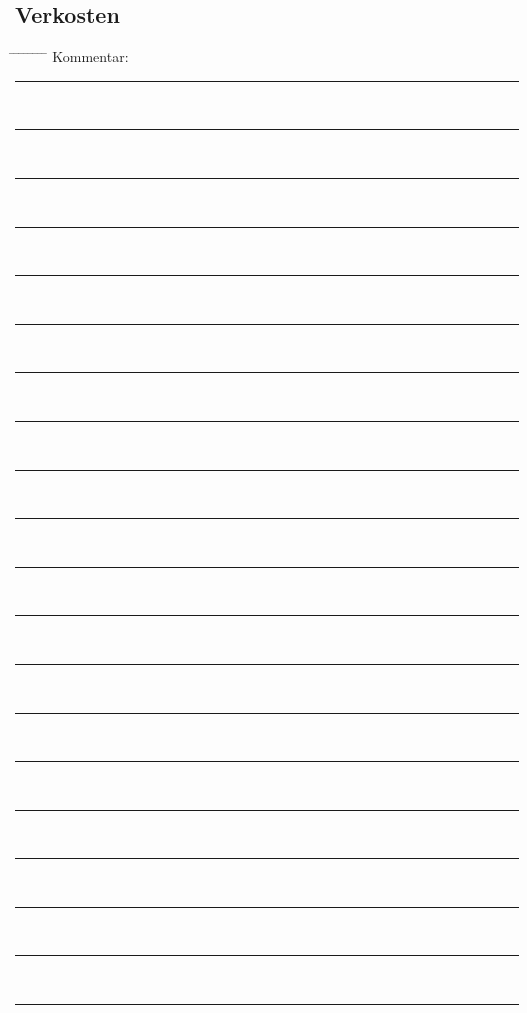 \documentclass[12pt,oneside,a4paper]{scrartcl}
\begin{document}
{\subsection*{Verkosten}
\begin{tabbing}
	\hspace{1cm} \= \hspace{1cm} \= \hspace{1cm} \= \hspace{1cm} \= \hspace{1cm} \= \hspace{1cm} \= \hspace{1cm} \= \hspace{1cm} \= \kill
	\> Kommentar: \>\>\> \rule[-0.1cm]{13cm}{0.5pt}\\
	\> \>  \rule[-0.1cm]{15.3cm}{0.5pt}\\
	\> \>  \rule[-0.1cm]{15.3cm}{0.5pt}\\
	\> \>  \rule[-0.1cm]{15.3cm}{0.5pt}\\		
	\> \>  \rule[-0.1cm]{15.3cm}{0.5pt}\\
	\> \>  \rule[-0.1cm]{15.3cm}{0.5pt}\\
	\> \>  \rule[-0.1cm]{15.3cm}{0.5pt}\\
	\> \>  \rule[-0.1cm]{15.3cm}{0.5pt}\\
	\> \>  \rule[-0.1cm]{15.3cm}{0.5pt}\\
	\> \>  \rule[-0.1cm]{15.3cm}{0.5pt}\\
	\> \>  \rule[-0.1cm]{15.3cm}{0.5pt}\\
	\> \>  \rule[-0.1cm]{15.3cm}{0.5pt}\\
	\> \>  \rule[-0.1cm]{15.3cm}{0.5pt}\\
	\> \>  \rule[-0.1cm]{15.3cm}{0.5pt}\\
	\> \>  \rule[-0.1cm]{15.3cm}{0.5pt}\\
	\> \>  \rule[-0.1cm]{15.3cm}{0.5pt}\\
	\> \>  \rule[-0.1cm]{15.3cm}{0.5pt}\\
	\> \>  \rule[-0.1cm]{15.3cm}{0.5pt}\\
	\> \>  \rule[-0.1cm]{15.3cm}{0.5pt}\\
	\> \>  \rule[-0.1cm]{15.3cm}{0.5pt}
\end{tabbing}}
\end{document}
